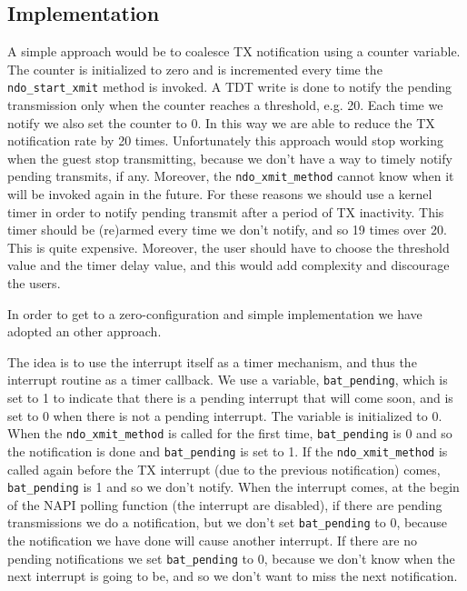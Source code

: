 \subsection{Implementation}
A simple approach would be to coalesce TX notification using a counter variable. The counter is initialized to zero and is incremented 
every time the \texttt{ndo\_start\_xmit} method is invoked. A TDT write is done to notify the pending transmission only when the counter 
reaches a threshold, e.g. 20. Each time we notify we also set the counter to 0.
In this way we are able to reduce the TX notification rate by 20 times.
Unfortunately this approach would stop working when the guest stop transmitting, because we don't have a way to timely notify pending 
transmits, if any. Moreover, the \texttt{ndo\_xmit\_method} cannot know when it will be invoked again in the future. 
For these reasons we should use a kernel timer in order to notify pending transmit after a period of TX inactivity. This timer should be
(re)armed every time we don't notify, and so 19 times over 20. This is quite expensive.
Moreover, the user should have to choose the threshold value and the timer delay value, and this would add complexity and discourage the
users.

In order to get to a zero-configuration and simple implementation we have adopted an other approach.

\vspace{0.5cm}

The idea is to use the interrupt itself as a timer mechanism, and thus the interrupt routine as a timer callback.
We use a variable, \texttt{bat\_pending}, which is set to 1 to indicate that there is a pending interrupt that will come soon, and is set 
to 0 when there is not a pending interrupt. The variable is initialized to 0.
When the \texttt{ndo\_xmit\_method} is called for the first time, \texttt{bat\_pending} is 0 and so the notification is done and 
\texttt{bat\_pending} is set to 1.
If the \texttt{ndo\_xmit\_method} is called again before the TX interrupt (due to the previous notification) comes, \texttt{bat\_pending}
is 1 and so we don't notify.
When the interrupt comes, at the begin of the NAPI polling function (the interrupt are disabled), if there are pending transmissions we do 
a notification, but we don't set \texttt{bat\_pending} to 0, because the notification we have done will cause another interrupt.
If there are no pending notifications we set \texttt{bat\_pending} to 0, because we don't know when the next interrupt is going to be, and
so we don't want to miss the next notification.

